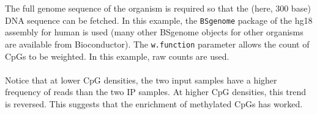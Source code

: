 \noindent The full genome sequence of the organism is required so that the (here, 300 base) DNA sequence can be fetched. In this example, the \texttt{BSgenome} package of the hg18 assembly for human is used (many other BSgenome objects for other organisms are available from Bioconductor). The \texttt{w.function} parameter allows the count of CpGs to be weighted. In this example, raw counts are used.
\ \\ \ \\
Notice that at lower CpG densities, the two input samples have a higher frequency of reads than the two IP samples. At higher CpG densities, this trend is reversed. This suggests that the enrichment of methylated CpGs has worked.
\ \\ \ \\




